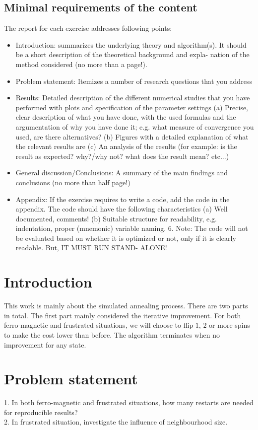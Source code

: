 \documentclass[10pt,a4paper]{article}
\begin{document}
\subsection{Minimal requirements of the content}
The report for each exercise addresses following points:
\begin{itemize}
\item Introduction: summarizes the underlying theory and algorithm(s). It should be a short description of the theoretical background and expla- nation of the method considered (no more than a page!).
\item Problem statement: Itemizes a number of research questions that you address
\item Results: Detailed description of the different numerical studies that you have performed with plots and specification of the parameter settings (a) Precise, clear description of what you have done, with the used formulas and the argumentation of why you have done it; e.g. what measure of convergence you used, are there alternatives? (b) Figures with a detailed explanation of what the relevant results are (c) An analysis of the results (for example: is the result as expected? why?/why not? what does the result mean? etc...)
\item General discussion/Conclusions: A summary of the main findings and conclusions (no more than half page!)
\item Appendix: If the exercise requires to write a code, add the code in the appendix. The code should have the following characteristics (a) Well documented, comments! (b) Suitable structure for readability, e.g. indentation, proper (mnemonic) variable naming. 6. Note: The code will not be evaluated based on whether it is optimized or not, only if it is clearly readable. But, IT MUST RUN STAND- ALONE!
\end{itemize}

\color{black}
\fi

\newpage
\section{Introduction}
This work is mainly about the simulated annealing process. There are two parts in total. The first part mainly considered the iterative improvement. For both ferro-magnetic and frustrated situations, we will choose to flip $1$, $2$ or more spins to make the cost lower than before. The algorithm terminates when no improvement for any state.


\section{Problem statement}
1. In both ferro-magnetic and frustrated situations, how many restarts are needed for reproducible results?\\
2. In frustrated situation, investigate the influence of neighbourhood size.
\end{document}
